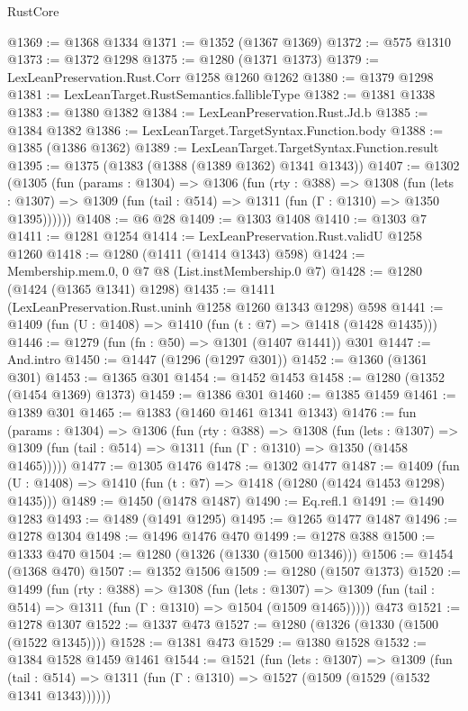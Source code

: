 \begin{lexlean}{RustCore}
\begin{coremodule}
@1369 := @1368 @1334
@1371 := @1352 (@1367 @1369)
@1372 := @575 @1310
@1373 := @1372 @1298
@1375 := @1280 (@1371 @1373)
@1379 := LexLeanPreservation.Rust.Corr @1258 @1260 @1262
@1380 := @1379 @1298
@1381 := LexLeanTarget.RustSemantics.fallibleType
@1382 := @1381 @1338
@1383 := @1380 @1382
@1384 := LexLeanPreservation.Rust.Jd.b
@1385 := @1384 @1382
@1386 := LexLeanTarget.TargetSyntax.Function.body
@1388 := @1385 (@1386 @1362)
@1389 := LexLeanTarget.TargetSyntax.Function.result
@1395 := @1375 (@1383 (@1388 (@1389 @1362) @1341 @1343))
@1407 := @1302
    (@1305
      (fun (params : @1304) =>
      @1306
        (fun (rty : @388) =>
        @1308
          (fun (lets : @1307) =>
          @1309 (fun (tail : @514) => @1311 (fun (Γ : @1310) => @1350 @1395))))))
@1408 := @6 @28
@1409 := @1303 @1408
@1410 := @1303 @7
@1411 := @1281 @1254
@1414 := LexLeanPreservation.Rust.validU @1258 @1260
@1418 := @1280 (@1411 (@1414 @1343) @598)
@1424 := Membership.mem.{0, 0} @7 @8 (List.instMembership.{0} @7)
@1428 := @1280 (@1424 (@1365 @1341) @1298)
@1435 := @1411 (LexLeanPreservation.Rust.uninh @1258 @1260 @1343 @1298) @598
@1441 := @1409 (fun (U : @1408) => @1410 (fun (t : @7) => @1418 (@1428 @1435)))
@1446 := @1279 (fun (fn : @50) => @1301 (@1407 @1441)) @301
@1447 := And.intro
@1450 := @1447 (@1296 (@1297 @301))
@1452 := @1360 (@1361 @301)
@1453 := @1365 @301
@1454 := @1452 @1453
@1458 := @1280 (@1352 (@1454 @1369) @1373)
@1459 := @1386 @301
@1460 := @1385 @1459
@1461 := @1389 @301
@1465 := @1383 (@1460 @1461 @1341 @1343)
@1476 := fun (params : @1304) =>
  @1306
    (fun (rty : @388) =>
    @1308
      (fun (lets : @1307) =>
      @1309 (fun (tail : @514) => @1311 (fun (Γ : @1310) => @1350 (@1458 @1465)))))
@1477 := @1305 @1476
@1478 := @1302 @1477
@1487 := @1409 (fun (U : @1408) => @1410 (fun (t : @7) => @1418 (@1280 (@1424 @1453 @1298) @1435)))
@1489 := @1450 (@1478 @1487)
@1490 := Eq.refl.{1}
@1491 := @1490 @1283
@1493 := @1489 (@1491 @1295)
@1495 := @1265 @1477 @1487
@1496 := @1278 @1304
@1498 := @1496 @1476 @470
@1499 := @1278 @388
@1500 := @1333 @470
@1504 := @1280 (@1326 (@1330 (@1500 @1346)))
@1506 := @1454 (@1368 @470)
@1507 := @1352 @1506
@1509 := @1280 (@1507 @1373)
@1520 := @1499
    (fun (rty : @388) =>
    @1308
      (fun (lets : @1307) =>
      @1309 (fun (tail : @514) => @1311 (fun (Γ : @1310) => @1504 (@1509 @1465)))))
    @473
@1521 := @1278 @1307
@1522 := @1337 @473
@1527 := @1280 (@1326 (@1330 (@1500 (@1522 @1345))))
@1528 := @1381 @473
@1529 := @1380 @1528
@1532 := @1384 @1528 @1459 @1461
@1544 := @1521
    (fun (lets : @1307) =>
    @1309
      (fun (tail : @514) => @1311 (fun (Γ : @1310) => @1527 (@1509 (@1529 (@1532 @1341 @1343))))))

\end{coremodule}
\end{lexlean}
